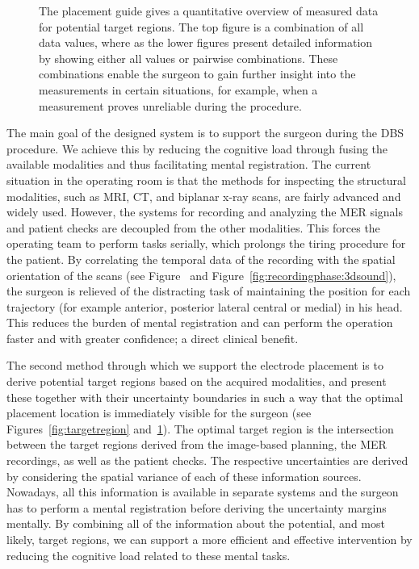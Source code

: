 \documentclass{egpubl}
\begin{document}
\begin{figure}[t]
  \centering
  \caption{The placement guide gives a quantitative overview of measured data for potential target regions. The top figure is a combination of all data values, where as the lower figures present detailed information by showing either all values or pairwise combinations. These combinations enable the surgeon to gain further insight into the measurements in certain situations, for example, when a measurement proves unreliable during the procedure.}
  \label{fig:placementguide}
\end{figure}

The main goal of the designed system is to support the surgeon during the DBS procedure. We achieve this by reducing the cognitive load through fusing the available modalities and thus facilitating mental registration. The current situation in the operating room is that the methods for inspecting the structural modalities, such as MRI, CT, and biplanar x-ray scans, are fairly advanced and widely used. However, the systems for recording and analyzing the MER signals and patient checks are decoupled from the other modalities. This forces the operating team to perform tasks serially, which prolongs the tiring procedure for the patient. By correlating the temporal data of the recording with the spatial orientation of the scans (see Figure~\label{fig:screenshot} and Figure~\ref{fig:recordingphase:3dsound}), the surgeon is relieved of the distracting task of maintaining the position for each trajectory (for example anterior, posterior lateral central or medial) in his head. This reduces the burden of mental registration and can perform the operation faster and with greater confidence; a direct clinical benefit.

The second method through which we support the electrode placement is to derive potential target regions based on the acquired modalities, and present these together with their uncertainty boundaries in such a way that the optimal placement location is immediately visible for the surgeon (see Figures~\ref{fig:targetregion} and~\ref{fig:placementguide}). The optimal target region is the intersection between the target regions derived from the image-based planning, the MER recordings, as well as the patient checks. The respective uncertainties are derived by considering the spatial variance of each of these information sources. Nowadays, all this information is available in separate systems and the surgeon has to perform a mental registration before deriving the uncertainty margins mentally. By combining all of the information about the potential, and most likely, target regions, we can support a more efficient and effective intervention by reducing the cognitive load related to these mental tasks.
\end{document}
